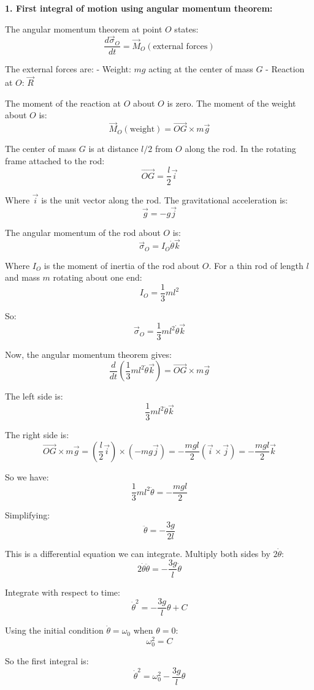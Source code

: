 \documentclass[12pt]{article}
\begin{document}
\begin{correctionbox}
\textbf{1. First integral of motion using angular momentum theorem:}

The angular momentum theorem at point $O$ states:
$$\frac{d\vec{\sigma}_O}{dt} = \vec{M}_O(\text{external forces})$$

The external forces are:
- Weight: $mg$ acting at the center of mass $G$
- Reaction at $O$: $\vec{R}$

The moment of the reaction at $O$ about $O$ is zero. The moment of the weight about $O$ is:
$$\vec{M}_O(\text{weight}) = \vec{OG} \times m\vec{g}$$

The center of mass $G$ is at distance $l/2$ from $O$ along the rod. In the rotating frame attached to the rod:
$$\vec{OG} = \frac{l}{2}\vec{i}$$

Where $\vec{i}$ is the unit vector along the rod. The gravitational acceleration is:
$$\vec{g} = -g\vec{j}$$

The angular momentum of the rod about $O$ is:
$$\vec{\sigma}_O = I_O\dot{\theta}\vec{k}$$

Where $I_O$ is the moment of inertia of the rod about $O$. For a thin rod of length $l$ and mass $m$ rotating about one end:
$$I_O = \frac{1}{3}ml^2$$

So:
$$\vec{\sigma}_O = \frac{1}{3}ml^2\dot{\theta}\vec{k}$$

Now, the angular momentum theorem gives:
$$\frac{d}{dt}\left(\frac{1}{3}ml^2\dot{\theta}\vec{k}\right) = \vec{OG} \times m\vec{g}$$

The left side is:
$$\frac{1}{3}ml^2\ddot{\theta}\vec{k}$$

The right side is:
$$\vec{OG} \times m\vec{g} = \left(\frac{l}{2}\vec{i}\right) \times (-mg\vec{j}) = -\frac{mgl}{2}(\vec{i} \times \vec{j}) = -\frac{mgl}{2}\vec{k}$$

So we have:
$$\frac{1}{3}ml^2\ddot{\theta} = -\frac{mgl}{2}$$

Simplifying:
$$\ddot{\theta} = -\frac{3g}{2l}$$

This is a differential equation we can integrate. Multiply both sides by $2\dot{\theta}$:
$$2\dot{\theta}\ddot{\theta} = -\frac{3g}{l}\dot{\theta}$$

Integrate with respect to time:
$$\dot{\theta}^2 = -\frac{3g}{l}\theta + C$$

Using the initial condition $\dot{\theta} = \omega_0$ when $\theta = 0$:
$$\omega_0^2 = C$$

So the first integral is:
$$\dot{\theta}^2 = \omega_0^2 - \frac{3g}{l}\theta$$


\end{correctionbox}
\end{document}
